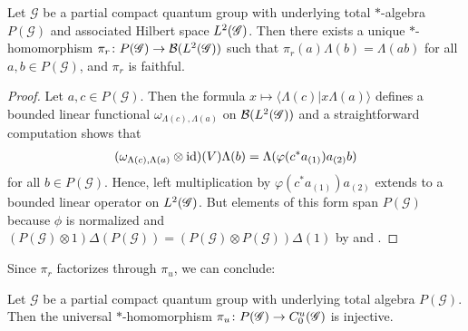 \begin{Prop} \label{prop:gns} Let $\mathscr{G}$ be a partial compact
  quantum group with underlying total $*$-algebra $P(\mathscr{G})$ and
  associated Hilbert space $L^{2}(\mathscr{G})$. Then there exists a unique
  $*$-homomorphism $\pi_{r}\colon P(\mathscr{G}) \to {\cal B}(L^{2}(\mathscr{G}))$
  such that $\pi_{r}(a)\Lambda(b)=\Lambda(ab)$ for all $a,b\in
  P(\mathscr{G})$, and $\pi_{r}$ is faithful.
\end{Prop}
\begin{proof} 
  Let $a,c \in P(\mathscr{G})$. Then the formula $x \mapsto \langle
\Lambda(c) | x\Lambda(a)\rangle$ defines a bounded linear functional
  $\omega_{\Lambda(c),\Lambda(a)}$ on ${\cal B}(L^{2}(\mathscr{G}))$ and a
  straightforward computation shows that
  \begin{align} \label{eq:vn-slice}
    (\omega_{\Lambda(c),\Lambda(a)}\otimes \operatorname{id})(V)\Lambda(b) =
    \Lambda(\varphi(c^*a_{(1)})a_{(2)}b)
  \end{align}
  for all $b\in P(\mathscr{G})$. Hence, left multiplication by
  $\varphi(c^*a_{(1)})a_{(2)}$ extends to a bounded linear operator on
  $L^{2}(\mathscr{G})$.  But elements of this form span $P(\mathscr{G})$ because
  $\phi$ is normalized and $(P(\mathscr{G})\otimes
  1)\Delta(P(\mathscr{G})) = (P(\mathscr{G})\otimes
  P(\mathscr{G}))\Delta(1)$ by \cite[Proposition 1.9]{DCT1} and
  \cite[Theorem 6.8]{Boh1}.
\end{proof}
Since $\pi_{r}$ factorizes through $\pi_{u}$, we can conclude:
\begin{Cor}
  Let $\mathscr{G}$ be a partial compact quantum group with underlying
  total algebra $P(\mathscr{G})$. Then the
universal $*$-homomorphism $\pi_{u} \colon P(\mathscr{G}) \to C^{u}_{0}(\mathscr{G})$ is injective.
\end{Cor}

